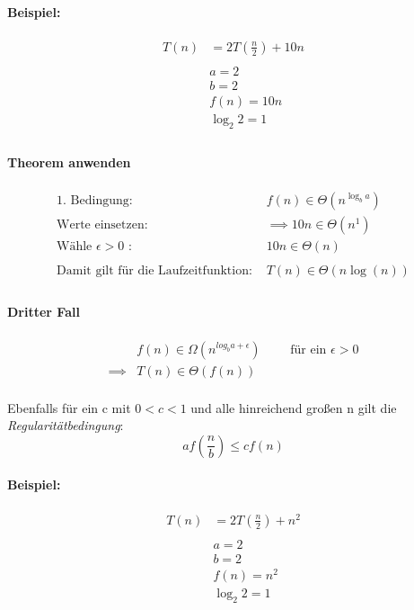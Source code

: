 \documentclass[a4paper]{scrartcl}
\begin{document}
	\paragraph{Beispiel:}
	\begin{align*}
	T(n)  &= 2T(\frac{n}{2}) +10n \\
	\\
	&a =2\\
	&b = 2\\
	&f(n) = 10n\\
	&\log_2 2 = 1\\
	\end{align*}
	
	\paragraph{Theorem anwenden}
	\begin{align*}
	\text{1. Bedingung: } &f(n) \in \Theta(n^{\log_b a})\\
	\text{Werte einsetzen: } &\implies 10n \in \Theta(n^1)\\
	\text{Wähle \(\epsilon > 0\) : }  &10n \in \Theta(n) \\
	\\
	\text{Damit gilt für die Laufzeitfunktion: } &T(n) \in \Theta(n \log (n))\\ 
	\end{align*}
	
	\newpage
	\paragraph{Dritter Fall}
	\begin{align*}
	&f(n) \in \Omega(n^{log_b a + \epsilon}) \qquad \text{ für ein } \epsilon >0 \\
	\implies& T(n) \in \Theta(f(n))\\	
	\end{align*}
	
	Ebenfalls für ein c mit  \(0 < c < 1\) und alle hinreichend großen n gilt die \emph{Regularitätbedingung}:
	\[af(\frac{n}{b}) \leq cf(n)\]
	
	\paragraph{Beispiel:}
	\begin{align*}
	T(n)  &= 2T(\frac{n}{2}) + n^2 \\
	\\
	&a =2\\
	&b = 2\\
	&f(n) = n^2\\
	&\log_2 2 = 1\\
	\end{align*}
	
\end{document}
